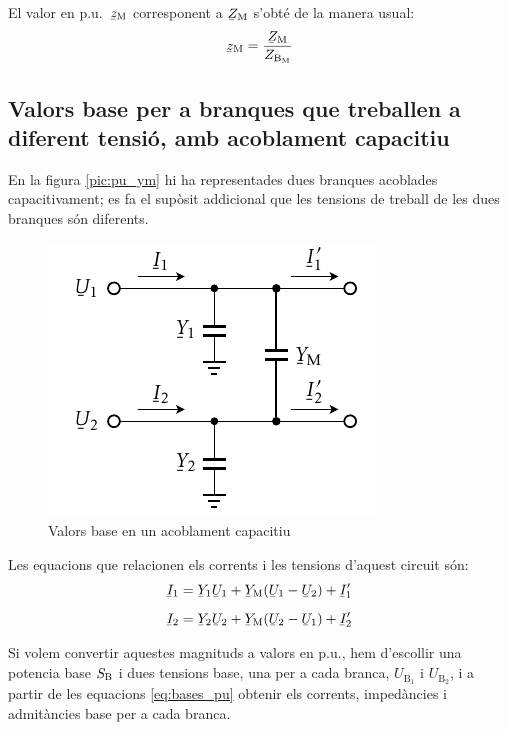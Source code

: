 El valor en p.u.\ $\cmplx{z}\ped{M}$ corresponent a $\cmplx{Z}\ped{M}$ s'obt\'{e} de la manera usual:
\begin{equation}
    \cmplx{z}\ped{M} = \frac{\cmplx{Z}\ped{M}}{Z_{\text{B}_\text{M}}}
\end{equation}


\subsection{Valors base per a branques que treballen a diferent tensi\'{o}, amb acoblament capacitiu}

En la figura \vref{pic:pu_ym} hi ha representades dues branques acoblades capacitivament; es fa el sup\`{o}sit addicional que les tensions de treball de les dues branques s\'{o}n diferents.
\begin{figure}[!h]
\centering
    \includegraphics{Imatges/Cap-Fonaments-pu-YM.pdf}
    \caption{Valors base en un acoblament capacitiu} \label{pic:pu_ym}
\end{figure}

Les equacions que relacionen els corrents i les tensions d'aquest circuit s\'{o}n:
\begin{subequations}
\begin{align}
    \cmplx{I}_1  &= \cmplx{Y}_1 \cmplx{U}_1 +  \cmplx{Y}\ped{M}(\cmplx{U}_1-\cmplx{U}_2)  + \cmplx{I}'_1   \\[2mm]
    \cmplx{I}_2  &= \cmplx{Y}_2 \cmplx{U}_2 +  \cmplx{Y}\ped{M}(\cmplx{U}_2-\cmplx{U}_1)  + \cmplx{I}'_2
\end{align}
\end{subequations}

Si volem convertir aquestes magnituds a valors en p.u., hem d'escollir  una potencia base $S_\mathrm{B}$ i dues tensions base, una  per a cada branca, $U_{\text{B}_1}$ i  $U_{\text{B}_2}$, i a partir de les equacions \eqref{eq:bases_pu} obtenir els corrents, imped\`{a}ncies i admit\`{a}ncies base per a cada branca.

